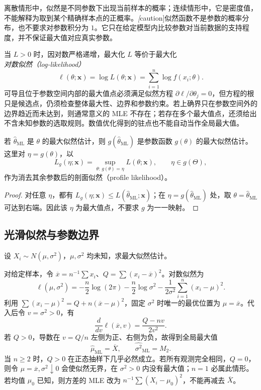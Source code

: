 离散情形中，似然是不同参数下出现当前样本的概率；连续情形中，它是密度值，不能解释为取到某个精确样本点的正概率。\emph[caution]{似然函数不是参数的概率分布，也不要求对参数积分为 $1$。}它只在给定模型内比较参数对当前数据的支持程度，并不保证最大值对应真实参数。

当 $L>0$ 时，因对数严格递增，最大化 $L$ 等价于最大化\emph{对数似然（log-likelihood）}
\[
  \ell(\theta;\boldsymbol x)=\log L(\theta;\boldsymbol x)
      =\sum_{i=1}^n\log f(x_i;\theta).
\]
可导且位于参数空间内部的最大值点必须满足似然方程 $\partial\ell/\partial\theta_j=0$，但方程的根只是候选点，仍须检查整体最大性、边界和参数约束。若上确界只在参数空间外的边界趋近而未达到，则通常意义的 MLE 不存在；若存在多个最大值点，还须给出不含未知参数的选取规则。数值优化得到的驻点也不能自动当作全局最大值。

\begin{proposition}[最大似然估计的不变性]
\label{prop:study-mle-invariance}
若 $\widehat\theta_{\mathrm{ML}}$ 是 $\theta$ 的最大似然估计，则 $g(\widehat\theta_{\mathrm{ML}})$ 是参数函数 $g(\theta)$ 的最大似然估计。这里对 $\eta=g(\theta)$，以
\[
  L_g(\eta;\boldsymbol x)
    =\sup_{\theta:\,g(\theta)=\eta}L(\theta;\boldsymbol x),
  \qquad\eta\in g(\Theta),
\]
作为消去其余参数后的剖面似然（profile likelihood）。
\end{proposition}

\begin{proof}
对任意 $\eta$，都有 $L_g(\eta;\boldsymbol x)\le L(\widehat\theta_{\mathrm{ML}};\boldsymbol x)$；在 $\eta=g(\widehat\theta_{\mathrm{ML}})$ 处，取 $\theta=\widehat\theta_{\mathrm{ML}}$ 可达到右端。因此该 $\eta$ 为最大值点，不要求 $g$ 为一一映射。
\end{proof}

\subsection{光滑似然与参数边界}

\begin{example}
\label{ex:study-normal-mle}
设 $X_i\sim N(\mu,\sigma^2)$，$\mu,\sigma^2$ 均未知，求最大似然估计。
\end{example}

\begin{solve}
对给定样本，令 $\overline x=n^{-1}\sum x_i$、$Q=\sum(x_i-\overline x)^2$。对数似然为
\[
  \ell(\mu,\sigma^2)
   =-\frac n2\log(2\pi)-\frac n2\log\sigma^2
      -\frac1{2\sigma^2}\sum_{i=1}^n(x_i-\mu)^2.
\]
利用 $\sum(x_i-\mu)^2=Q+n(\overline x-\mu)^2$，固定 $\sigma^2$ 时唯一的最优位置为 $\mu=\overline x$。代入后令 $v=\sigma^2>0$，有
\[
  \frac{d}{dv}\ell(\overline x,v)=\frac{Q-nv}{2v^2}.
\]
若 $Q>0$，导数在 $v=Q/n$ 左侧为正、右侧为负，故得到全局最大值
\begin{equation}
  \widehat\mu_{\mathrm{ML}}=\overline X,\qquad
  \widehat{\sigma^2}_{\mathrm{ML}}=M_2.
  \label{eq:study-normal-mle}
\end{equation}
当 $n\ge2$ 时，$Q>0$ 在正态抽样下几乎必然成立。若所有观测完全相同，$Q=0$，则令 $\mu=\overline x,\sigma^2\downarrow0$ 会使似然无界，在 $\sigma^2>0$ 内没有最大值；$n=1$ 必属此情形。若均值 $\mu_0$ 已知，则方差的 MLE 改为 $n^{-1}\sum(X_i-\mu_0)^2$，不能再减去 $\overline X$。
\end{solve}

